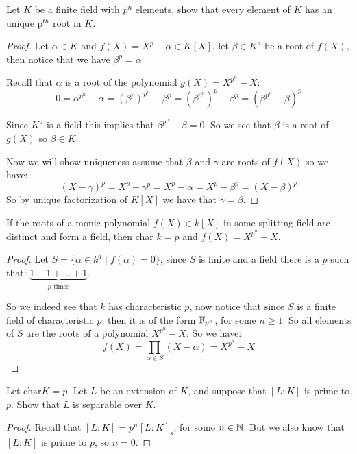 \begin{exercise}
Let $K$ be a finite field with $p^n$ elements, show that every element of $K$ has an unique p$^{th}$ root in $K$.
\begin{proof}
   Let $\alpha\in K$ and $f(X) = X^p-\alpha\in K[X]$, let $\beta\in K^a$ be a root of $f(X)$, then notice that we have $\beta^p = \alpha$  
   
   Recall that $\alpha$ is a root of the polynomial $g(X) = X^{p^n}-X$:\begin{equation}
       0 = \alpha^{p^n}-\alpha = (\beta^p)^{p^n}-\beta^p = (\beta^{p^n})^p-\beta^p = (\beta^{p^n}-\beta)^p
   \end{equation}
   
   Since $K^a$ is a field this implies that $\beta^{p^n}-\beta = 0$. So we see that $\beta$ is a root of $g(X)$ so $\beta\in K$.
   
   Now we will show uniqueness assume that $\beta$ and $\gamma$ are roots of $f(X)$ so we have:\begin{equation}
       (X-\gamma)^p = X^p-\gamma^p = X^p-\alpha = X^p-\beta^p = (X-\beta)^p
   \end{equation}
   So by unique factorization of $K[X]$ we have that $\gamma = \beta$.
\end{proof}
\end{exercise}
\begin{exercise} If the roots of a monic polynomial $f(X)\in k[X]$ in some splitting field are distinct and form a field, then char $k=p$ and $f(X) = X^{p^n}-X$.
\begin{proof}
  Let $S = \{\alpha\in k^a \mid f(\alpha) = 0\}$, since $S$ is finite and a field there is a $p$ such that: $\underbrace{1+1+\dots+1}_{p\text{ times}}$.
  
  So we indeed see that $k$ has characteristic $p$, now notice that since $S$ is a finite field of characteristic $p$, then it is of the form $\mathbb{F}_{p^n}$, for some $n\geq 1$. So all elements of $S$ are the roots of a polynomial $X^{p^n}-X$. So we have:\begin{equation}
      f(X) = \prod_{\alpha\in S}(X-\alpha) = X^{p^n}-X
  \end{equation}
\end{proof}
\end{exercise}
\begin{exercise}
Let $\text{char} K = p$. Let $L$ be an extension of $K$, and suppose that $[L\colon K]$ is prime to $p$. Show that $L$ is separable over $K$.
\begin{proof}
    Recall that $[L\colon K] = p^n{[L\colon K]}_s$, for some $n\in \mathbb{N}$. But we also know that $[L\colon K]$ is prime to $p$, so $n=0$. 
\end{proof}
\end{exercise}

